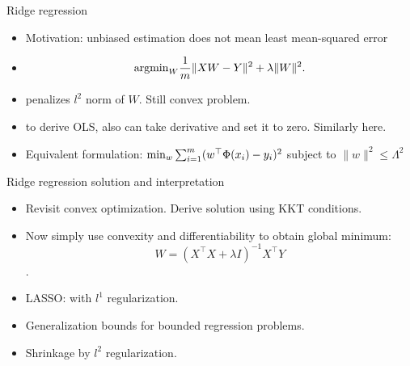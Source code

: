 \documentclass[final]{beamer}
\begin{document}
\begin{frame}{Ridge regression}
	\begin{itemize}
		\item Motivation: unbiased estimation does not mean least mean-squared error
		\pause
		\item 
	$$ {\rm arg min}_{W} \dfrac{1}{m} \|X W - Y\|^2 + \lambda \|W\|^2.$$
		\pause
	\item penalizes $l^2$ norm of $W$. Still convex problem.
	\pause 
	\item to derive OLS, also can take derivative and set it to zero. Similarly here.
	\pause
\item Equivalent formulation:
	$ {\rm min}_w \sum_{i=1}^m (w^\top \Phi(x_i) - y_i)^2$ subject to $\|w\|^2 \leq \Lambda^2$
	\end{itemize}
\end{frame}
\begin{frame}{Ridge regression solution and interpretation}
	\begin{itemize}
		\item Revisit convex optimization. Derive solution using KKT conditions.
		\pause
		\item Now simply use convexity and differentiability to obtain global minimum:
			$$W = (X^\top X + \lambda I)^{-1} X^\top Y$$. 
		\pause
		\item LASSO: with $l^1$ regularization.
		\pause
		\item Generalization bounds for bounded regression problems.
		\pause 
	\item Shrinkage by $l^2$ regularization.
	\end{itemize}

\end{frame}
\end{document}
